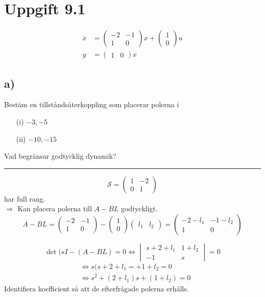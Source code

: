 \documentclass[12pt]{article}
\newcommand{\qline}{\hrule \vspace*{10pt}}
\begin{document}
\section{Uppgift 9.1}

\begin{align*}
\dot{x} &= \begin{pmatrix}
-2 & -1 \\
1 & 0
\end{pmatrix}x + \begin{pmatrix}
1 \\
0
\end{pmatrix}u \\
y &= \begin{pmatrix}
1 & 0
\end{pmatrix}x
\end{align*}

\subsection*{a)}
Bestäm en tillståndsåterkoppling som placerar polerna i
\begin{itemize}
\item[(i)] $-3,-5$ \\
\item[(ii)] $-10, -15$
\end{itemize} 
Vad begränsar godtycklig dynamik?
\qline
\[\mathcal{S} = \begin{pmatrix}
1 & -2 \\
0 & 1
\end{pmatrix} \]
har full rang. \\
$\Rightarrow$ Kan placera polerna till $A-BL$ godtyckligt.
\[A-BL = \begin{pmatrix}
-2 & -1 \\
1 & 0
\end{pmatrix} - \begin{pmatrix}
1 \\
0
\end{pmatrix} \begin{pmatrix}
l_1 & l_2
\end{pmatrix} = \begin{pmatrix}
-2-l_1 & -1-l_2 \\
1 & 0
\end{pmatrix} \]

\[\det{(sI - (A-BL)} = 0 \Leftrightarrow \begin{vmatrix}
s + 2 + l_1 & 1 + l_2 \\
-1 & s
\end{vmatrix} = 0 \]
\begin{align*}
&\Leftrightarrow s(s+2+l_1= + 1 + l_2 = 0 \\
&\Leftrightarrow s^2 + (2 + l_1)s + (1 + l_2) = 0
\end{align*}
Identifiera koefficient så att de efterfrågade polerna erhålls. \\
\end{document}
